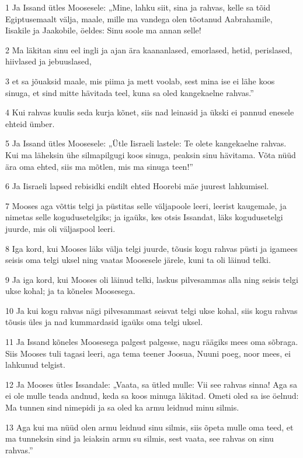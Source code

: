 \par 1 Ja Issand ütles Moosesele: „Mine, lahku siit, sina ja rahvas, kelle sa tõid Egiptusemaalt välja, maale, mille ma vandega olen tõotanud Aabrahamile, Iisakile ja Jaakobile, öeldes: Sinu soole ma annan selle!
\par 2 Ma läkitan sinu eel ingli ja ajan ära kaananlased, emorlased, hetid, perislased, hiivlased ja jebuuslased,
\par 3 et sa jõuaksid maale, mis piima ja mett voolab, sest mina ise ei lähe koos sinuga, et sind mitte hävitada teel, kuna sa oled kangekaelne rahvas.”
\par 4 Kui rahvas kuulis seda kurja kõnet, siis nad leinasid ja ükski ei pannud enesele ehteid ümber.
\par 5 Ja Issand ütles Moosesele: „Ütle Iisraeli lastele: Te olete kangekaelne rahvas. Kui ma läheksin ühe silmapilgugi koos sinuga, peaksin sinu hävitama. Võta nüüd ära oma ehted, siis ma mõtlen, mis ma sinuga teen!”
\par 6 Ja Iisraeli lapsed rebisidki endilt ehted Hoorebi mäe juurest lahkumisel.
\par 7 Mooses aga võttis telgi ja püstitas selle väljapoole leeri, leerist kaugemale, ja nimetas selle kogudusetelgiks; ja igaüks, kes otsis Issandat, läks kogudusetelgi juurde, mis oli väljaspool leeri.
\par 8 Iga kord, kui Mooses läks välja telgi juurde, tõusis kogu rahvas püsti ja igamees seisis oma telgi uksel ning vaatas Moosesele järele, kuni ta oli läinud telki.
\par 9 Ja iga kord, kui Mooses oli läinud telki, laskus pilvesammas alla ning seisis telgi ukse kohal; ja ta kõneles Moosesega.
\par 10 Ja kui kogu rahvas nägi pilvesammast seisvat telgi ukse kohal, siis kogu rahvas tõusis üles ja nad kummardasid igaüks oma telgi uksel.
\par 11 Ja Issand kõneles Moosesega palgest palgesse, nagu räägiks mees oma sõbraga. Siis Mooses tuli tagasi leeri, aga tema teener Joosua, Nuuni poeg, noor mees, ei lahkunud telgist.
\par 12 Ja Mooses ütles Issandale: „Vaata, sa ütled mulle: Vii see rahvas sinna! Aga sa ei ole mulle teada andnud, keda sa koos minuga läkitad. Ometi oled sa ise öelnud: Ma tunnen sind nimepidi ja sa oled ka armu leidnud minu silmis.
\par 13 Aga kui ma nüüd olen armu leidnud sinu silmis, siis õpeta mulle oma teed, et ma tunneksin sind ja leiaksin armu su silmis, sest vaata, see rahvas on sinu rahvas.”
